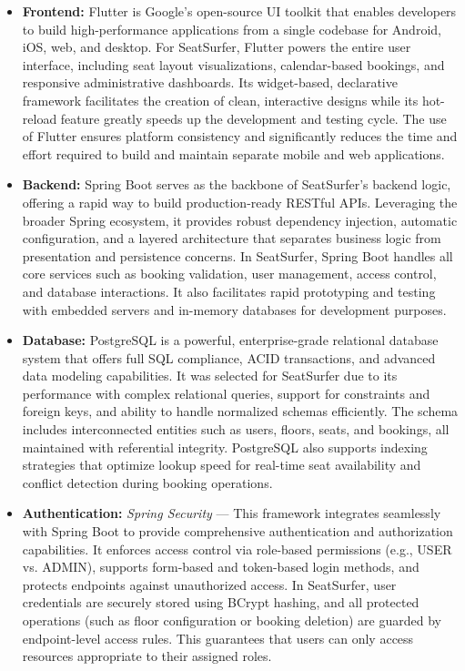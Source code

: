 \documentclass[12pt,a4paper]{report} %
\begin{document}
\begin{itemize}
    \item \textbf{Frontend:} Flutter is Google's open-source UI toolkit that enables developers to build high-performance applications from a single codebase for Android, iOS, web, and desktop. For SeatSurfer, Flutter powers the entire user interface, including seat layout visualizations, calendar-based bookings, and responsive administrative dashboards. Its widget-based, declarative framework facilitates the creation of clean, interactive designs while its hot-reload feature greatly speeds up the development and testing cycle. The use of Flutter ensures platform consistency and significantly reduces the time and effort required to build and maintain separate mobile and web applications.

    \item \textbf{Backend:} Spring Boot serves as the backbone of SeatSurfer's backend logic, offering a rapid way to build production-ready RESTful APIs. Leveraging the broader Spring ecosystem, it provides robust dependency injection, automatic configuration, and a layered architecture that separates business logic from presentation and persistence concerns. In SeatSurfer, Spring Boot handles all core services such as booking validation, user management, access control, and database interactions. It also facilitates rapid prototyping and testing with embedded servers and in-memory databases for development purposes.

    \item \textbf{Database:} PostgreSQL is a powerful, enterprise-grade relational database system that offers full SQL compliance, ACID transactions, and advanced data modeling capabilities. It was selected for SeatSurfer due to its performance with complex relational queries, support for constraints and foreign keys, and ability to handle normalized schemas efficiently. The schema includes interconnected entities such as users, floors, seats, and bookings, all maintained with referential integrity. PostgreSQL also supports indexing strategies that optimize lookup speed for real-time seat availability and conflict detection during booking operations.

    \item \textbf{Authentication:} \textit{Spring Security} — This framework integrates seamlessly with Spring Boot to provide comprehensive authentication and authorization capabilities. It enforces access control via role-based permissions (e.g., USER vs. ADMIN), supports form-based and token-based login methods, and protects endpoints against unauthorized access. In SeatSurfer, user credentials are securely stored using BCrypt hashing, and all protected operations (such as floor configuration or booking deletion) are guarded by endpoint-level access rules. This guarantees that users can only access resources appropriate to their assigned roles.


\end{itemize}
\end{document}
